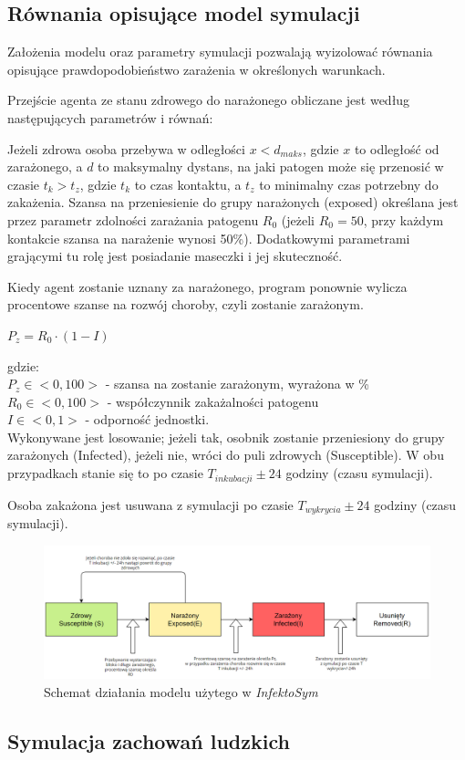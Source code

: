 \subsection{\textbf{Równania opisujące model symulacji}}
Założenia modelu oraz parametry symulacji pozwalają wyizolować równania opisujące prawdopodobieństwo zarażenia w określonych warunkach.

Przejście agenta ze stanu zdrowego do narażonego obliczane jest według następujących parametrów i równań:

Jeżeli zdrowa osoba przebywa w odległości $x < d_{maks}$, gdzie $x$ to odległość od zarażonego, a $d$ to maksymalny dystans, na jaki patogen może się przenosić w czasie $t_k > t_z$, gdzie $t_k$ to czas kontaktu, a $t_z$ to minimalny czas potrzebny do zakażenia. Szansa na przeniesienie do grupy narażonych (exposed) określana jest przez parametr zdolności zarażania patogenu $R_0$ (jeżeli $R_0 = 50$, przy każdym kontakcie szansa na narażenie wynosi 50\%).
Dodatkowymi parametrami grającymi tu rolę jest posiadanie maseczki i jej skuteczność. 

Kiedy agent zostanie uznany za narażonego, program ponownie wylicza procentowe szanse na rozwój choroby, czyli zostanie zarażonym.

\begin{center}
	$P_z = R_0 \cdot (1 - I)$
\end{center}

gdzie:\\
$P_z \in <0,100> $ - szansa na zostanie zarażonym, wyrażona w \% \\
$R_0 \in <0,100>$ - współczynnik zakażalności patogenu \\
$I \in <0,1>$ - odporność jednostki.\\

Wykonywane jest losowanie; jeżeli tak, osobnik zostanie przeniesiony do grupy zarażonych (Infected), jeżeli nie, wróci do puli zdrowych (Susceptible). W obu przypadkach stanie się to po czasie $T_{inkubacji} \pm 24$ godziny (czasu symulacji).

Osoba zakażona jest usuwana z symulacji po czasie $T_{wykrycia} \pm 24$ godziny (czasu symulacji).

\begin{figure}[h!]
	\includegraphics[width=\linewidth]{diagramModelu.png}
	\caption{Schemat działania modelu użytego w \textit{InfektoSym}}
\end{figure}

\subsection{\textbf{Symulacja zachowań ludzkich}}


